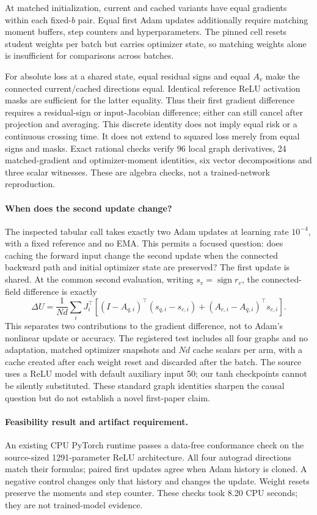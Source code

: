 \documentclass[11pt,a4paper]{article}
\begin{document}
At matched initialization, current and cached variants have equal gradients
within each fixed-$b$ pair. Equal first Adam updates additionally require
matching moment buffers, step counters and hyperparameters. The pinned
cell resets student weights per batch but carries optimizer state, so
matching weights alone is insufficient for comparisons across batches.

For absolute loss at a shared state, equal residual signs and equal $A_v$
make the connected current/cached directions equal. Identical reference
ReLU activation masks are sufficient for the latter equality. Thus their
first gradient difference requires a residual-sign or input-Jacobian
difference; either can still cancel after projection and averaging.
This discrete identity does not imply equal risk or a continuous crossing
time. It does not extend to squared loss merely from equal signs and masks.
Exact rational checks verify 96 local graph derivatives, 24 matched-gradient
and optimizer-moment identities, six vector decompositions and three scalar
witnesses. These are algebra checks, not a trained-network reproduction.

\paragraph{When does the second update change?}
The inspected tabular call takes exactly two Adam updates at learning rate
$10^{-4}$, with a fixed reference and no EMA. This permits a focused question:
does caching the forward input change the second update when the connected
backward path and initial optimizer state are preserved? The first update
is shared. At the common second evaluation, writing $s_v=\operatorname{sign}r_v$,
the connected-field difference is exactly
\[
 \Delta U=\frac1{Nd}\sum_iJ_i^\top\left[
 (I-A_{q,i})^\top(s_{q,i}-s_{c,i})
 +(A_{c,i}-A_{q,i})^\top s_{c,i}\right].
\]
This separates two contributions to the gradient difference, not to Adam's
nonlinear update or accuracy. The registered test includes all four graphs
and no adaptation, matched optimizer snapshots and $Nd$ cache scalars per
arm, with a cache created after each weight reset and discarded after the
batch. The source uses a ReLU model with default auxiliary input 50;
our tanh checkpoints cannot be silently substituted. These standard graph
identities sharpen the causal question but do not establish a novel
first-paper claim.

\paragraph{Feasibility result and artifact requirement.}
An existing CPU PyTorch runtime passes a data-free conformance check on
the source-sized 1291-parameter ReLU architecture. All four autograd
directions match their formulas; paired first updates agree when Adam
history is cloned. A negative control changes only that history and
changes the update. Weight resets preserve the moments and step counter.
These checks took 8.20 CPU seconds; they are not trained-model evidence.
\end{document}

